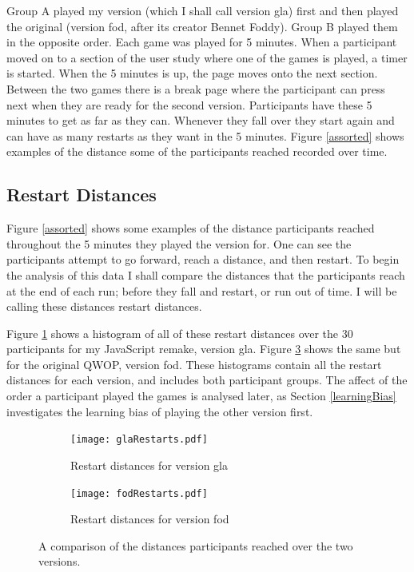 \documentclass[12pt,a4paper,twoside,openright]{report}
\begin{document}
Group A played my version (which I shall call version gla) first and then played the original (version fod, after its creator Bennet Foddy). Group B played them in the opposite order.
Each game was played for 5 minutes. When a participant moved on to a section of the user study where one of the games is played, a timer is started. When the 5 minutes is up, the page moves onto the next section. Between the two games there is a break page where the participant can press next when they are ready for the second version.
Participants have these 5 minutes to get as far as they can. Whenever they fall over they start again and can have as many restarts as they want in the 5 minutes. Figure \ref{assorted} shows examples of the distance some of the participants reached recorded over time.

\subsection{Restart Distances}
\label{restartDistances}

Figure \ref{assorted} shows some examples of the distance participants reached throughout the 5 minutes they played the version for. One can see the participants attempt to go forward, reach a distance, and then restart.
To begin the analysis of this data I shall compare the distances that the participants reach at the end of each run; before they fall and restart, or run out of time. I will be calling these distances restart distances.

Figure \ref{glaRestarts} shows a histogram of all of these restart distances over the 30 participants for my JavaScript remake, version gla. Figure \ref{fodRestarts} shows the same but for the original QWOP, version fod.
These histograms contain all the restart distances for each version, and includes both participant groups.
The affect of the order a participant played the games is analysed later, as Section \ref{learningBias} investigates the learning bias of playing the other version first.

\begin{figure}
    \begin{subfigure}[t]{1\textwidth}
    \centerline{\texttt{[image: glaRestarts.pdf]}}
    \caption{Restart distances for version gla}
    \label{glaRestarts}
    \end{subfigure}

    \begin{subfigure}[t]{1\textwidth}
    \centerline{\texttt{[image: fodRestarts.pdf]}}
    \caption{Restart distances for version fod}
    \label{fodRestarts}
    \end{subfigure}
    
    \caption{A comparison of the distances participants reached over the two versions.}
\end{figure}
\end{document}
